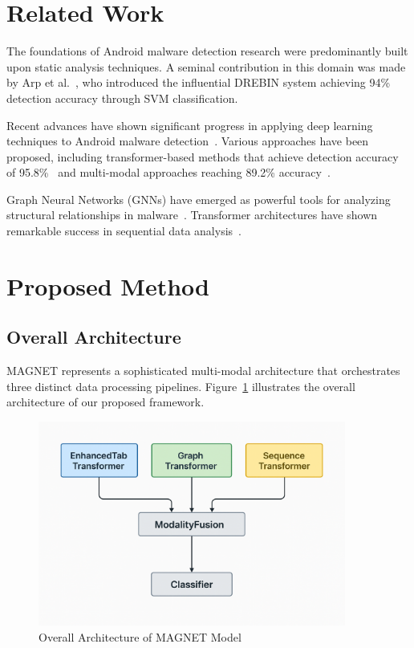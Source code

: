 \documentclass[a4paper,11pt]{article}
\begin{document}
\section{Related Work}
The foundations of Android malware detection research were predominantly built upon static analysis techniques. A seminal contribution in this domain was made by Arp et al.~\cite{Drebin}, who introduced the influential DREBIN system achieving 94\% detection accuracy through SVM classification.

Recent advances have shown significant progress in applying deep learning techniques to Android malware detection~\cite{Vinayakumar2019}. Various approaches have been proposed, including transformer-based methods that achieve detection accuracy of 95.8\%~\cite{TransformerMalware} and multi-modal approaches reaching 89.2\% accuracy~\cite{Alsaleh2023}.

Graph Neural Networks (GNNs) have emerged as powerful tools for analyzing structural relationships in malware~\cite{Kipf2017,Velickovic2018}. Transformer architectures have shown remarkable success in sequential data analysis~\cite{attention}.

\section{Proposed Method}
\subsection{Overall Architecture}
MAGNET represents a sophisticated multi-modal architecture that orchestrates three distinct data processing pipelines. Figure~\ref{fig:architecture} illustrates the overall architecture of our proposed framework.

\begin{figure}[!htb]
  \centering
  \includegraphics[width=0.9\textwidth]{../images/magnet_architecture.png}
  \caption{Overall Architecture of MAGNET Model}
  \label{fig:architecture}
\end{figure}
\end{document}
